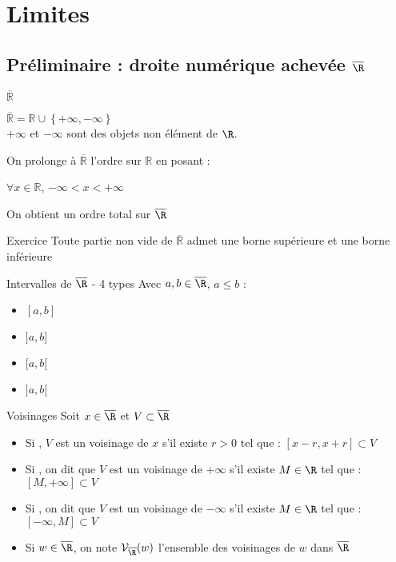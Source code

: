 \documentclass[12pt,a4paper]{report}
\begin{document}
\chapter{Limites}

\section{Préliminaire : droite numérique achevée $\overline{\R}$} 

\begin{definition}{$\overline{\mathbb{R}}$}{}
\begin{center}
    $\overline{\mathbb{R}}=\mathbb{R}\cup\left\{ +\infty,-\infty\right\} $\\
    $+\infty$ et $-\infty$ sont des objets non élément de $\R$.
\end{center}

On prolonge à $\overline{\mathbb{R}}$ l'ordre sur $\mathbb{R}$ en posant :
\begin{center}
    $\forall x\in\mathbb{R}$, $-\infty<x<+\infty$
\end{center}

On obtient un ordre total sur $\overline{\R}$
\end{definition}

\begin{application}{Exercice}{}
Toute partie non vide de $\overline{\mathbb{R}}$ admet une borne supérieure et une borne inférieure 
\end{application}

\begin{definition}{Intervalles de $\overline{\R}$ - 4 types}{}
Avec $a,b \in \overline{\R}$, $a \leq b$ : 
\begin{multicols}{4}
\begin{itemize}
    \item $[a,b]$
    \item $]a,b]$
    \item $[a,b[$
    \item $]a,b[$
\end{itemize}
\end{multicols}
\end{definition}

\begin{definition}{Voisinages}{}
Soit $x \in \overline{\R}$ et $V \subset \overline{\R}$ 
\begin{itemize}
    \item Si , $V$ est un voisinage de $x$ s'il existe $r>0$ tel que : $[x-r,x+r]\subset V$
    \item Si , on dit que $V$ est un voisinage de $+ \infty$ s'il existe $M \in \R$ tel que : $[M,+\infty]\subset V$
    \item Si , on dit que $V$ est un voisinage de $- \infty$ s'il existe $M \in \R$ tel que : $[-\infty , M]\subset V$
    \item Si $w \in \overline{\R}$, on note $\mathcal{V}_{\overline{\R}} (w)$ l'ensemble des voisinages de $w$ dans $\overline{\R}$
\end{itemize}
\end{definition}
\end{document}
